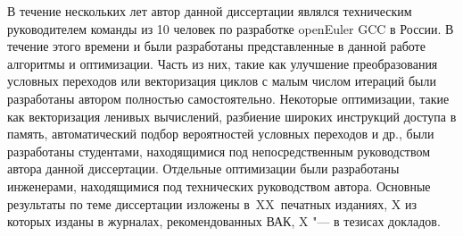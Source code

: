{\contribution} В течение нескольких лет автор данной диссертации являлся техническим руководителем команды из 10 человек по разработке openEuler GCC в России. В течение этого времени и были разработаны представленные в данной работе алгоритмы и оптимизации. Часть из них, такие как  улучшение преобразования условных переходов или векторизация циклов с малым числом итераций  были разработаны автором полностью самостоятельно. Некоторые оптимизации, такие как векторизация ленивых вычислений, разбиение широких инструкций доступа в память, автоматический подбор вероятностей условных переходов и др., были разработаны студентами, находящимися под непосредственным руководством автора данной диссертации. Отдельные оптимизации были разработаны инженерами, находящимися под технических руководством автора.
{%
    {\publications} Основные результаты по теме диссертации изложены
    в~XX~печатных изданиях,
    X из которых изданы в журналах, рекомендованных ВАК,
    X "--- в тезисах докладов.
}%
